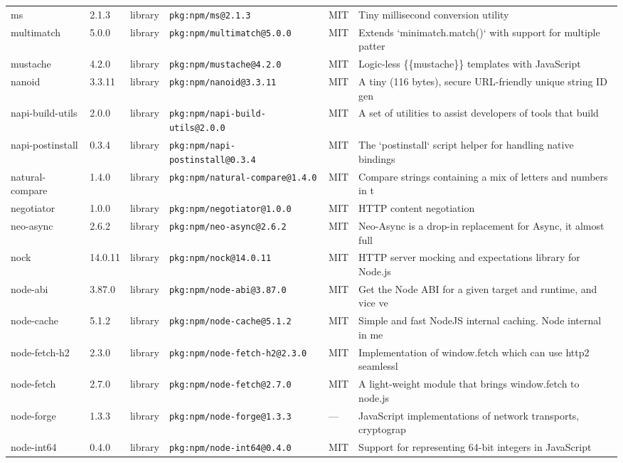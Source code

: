 \documentclass[11pt]{article}
\begin{document}
\begin{longtable}{|l|l|l|p{2.2cm}|l|p{4cm}|}
ms & 2.1.3 & library & \texttt{pkg:npm/ms@2.1.3} & MIT & Tiny millisecond conversion utility \\
multimatch & 5.0.0 & library & \texttt{pkg:npm/multimatch@5.0.0} & MIT & Extends `minimatch.match()` with support for multiple patter \\
mustache & 4.2.0 & library & \texttt{pkg:npm/mustache@4.2.0} & MIT & Logic-less \{\{mustache\}\} templates with JavaScript \\
nanoid & 3.3.11 & library & \texttt{pkg:npm/nanoid@3.3.11} & MIT & A tiny (116 bytes), secure URL-friendly unique string ID gen \\
napi-build-utils & 2.0.0 & library & \texttt{pkg:npm/napi-build-utils@2.0.0} & MIT & A set of utilities to assist developers of tools that build  \\
napi-postinstall & 0.3.4 & library & \texttt{pkg:npm/napi-postinstall@0.3.4} & MIT & The `postinstall` script helper for handling native bindings \\
natural-compare & 1.4.0 & library & \texttt{pkg:npm/natural-compare@1.4.0} & MIT & Compare strings containing a mix of letters and numbers in t \\
negotiator & 1.0.0 & library & \texttt{pkg:npm/negotiator@1.0.0} & MIT & HTTP content negotiation \\
neo-async & 2.6.2 & library & \texttt{pkg:npm/neo-async@2.6.2} & MIT & Neo-Async is a drop-in replacement for Async, it almost full \\
nock & 14.0.11 & library & \texttt{pkg:npm/nock@14.0.11} & MIT & HTTP server mocking and expectations library for Node.js \\
node-abi & 3.87.0 & library & \texttt{pkg:npm/node-abi@3.87.0} & MIT & Get the Node ABI for a given target and runtime, and vice ve \\
node-cache & 5.1.2 & library & \texttt{pkg:npm/node-cache@5.1.2} & MIT & Simple and fast NodeJS internal caching. Node internal in me \\
node-fetch-h2 & 2.3.0 & library & \texttt{pkg:npm/node-fetch-h2@2.3.0} & MIT & Implementation of window.fetch which can use http2 seamlessl \\
node-fetch & 2.7.0 & library & \texttt{pkg:npm/node-fetch@2.7.0} & MIT & A light-weight module that brings window.fetch to node.js \\
node-forge & 1.3.3 & library & \texttt{pkg:npm/node-forge@1.3.3} & — & JavaScript implementations of network transports, cryptograp \\
node-int64 & 0.4.0 & library & \texttt{pkg:npm/node-int64@0.4.0} & MIT & Support for representing 64-bit integers in JavaScript \\

\end{longtable}
\end{document}
